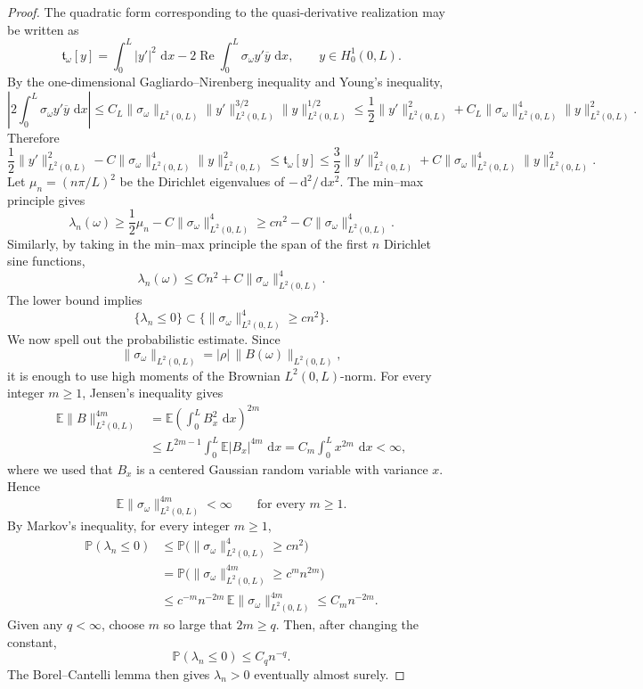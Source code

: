 \documentclass[11pt]{article}
\newcommand{\dd}{\,\mathrm d}
\newcommand{\E}{\mathbb E}
\newcommand{\Prob}{\mathbb P}
\begin{document}
\begin{proof}
 The quadratic form corresponding to the quasi-derivative realization may be written as
\[
    \mathfrak t_\omega[y]
    =\int_0^L |y'|^2\,\dd x
      -2\operatorname{Re}\int_0^L \sigma_\omega y'\overline y\,\dd x,
    \qquad y\in H_0^1(0,L).
\]
By the one-dimensional Gagliardo--Nirenberg inequality and Young's inequality,
\[
    \left|2\int_0^L\sigma_\omega y'\overline y\,\dd x\right|
    \le C_L\|\sigma_\omega\|_{L^2(0,L)}\|y'\|_{L^2(0,L)}^{3/2}\|y\|_{L^2(0,L)}^{1/2}
    \le \frac12\|y'\|_{L^2(0,L)}^2
        +C_L\|\sigma_\omega\|_{L^2(0,L)}^4\|y\|_{L^2(0,L)}^2.
\]
Therefore
\[
    \frac12\|y'\|_{L^2(0,L)}^2
      -C\|\sigma_\omega\|_{L^2(0,L)}^4\|y\|_{L^2(0,L)}^2
    \le
    \mathfrak t_\omega[y]
    \le
    \frac32\|y'\|_{L^2(0,L)}^2
      +C\|\sigma_\omega\|_{L^2(0,L)}^4\|y\|_{L^2(0,L)}^2 .
\]
Let \(\mu_n=(n\pi/L)^2\) be the Dirichlet eigenvalues of \(-\dd^2/\dd x^2\). The min--max principle gives
\[
    \lambda_n(\omega)
    \ge \frac12 \mu_n-C\|\sigma_\omega\|_{L^2(0,L)}^4
    \ge c n^2-C\|\sigma_\omega\|_{L^2(0,L)}^4 .
\]
Similarly, by taking in the min--max principle the span of the first \(n\) Dirichlet sine functions,
\[
    \lambda_n(\omega)
    \le C n^2+C\|\sigma_\omega\|_{L^2(0,L)}^4 .
\]
The lower bound implies
\[
    \{\lambda_n\le0\}
    \subset
    \{\|\sigma_\omega\|_{L^2(0,L)}^4\ge c n^2\}.
\]
We now spell out the probabilistic estimate. Since
\[
    \|\sigma_\omega\|_{L^2(0,L)}=|\rho|\,\|B(\omega)\|_{L^2(0,L)},
\]
it is enough to use high moments of the Brownian \(L^2(0,L)\)-norm. For every integer \(m\ge1\), Jensen's inequality gives
\[
\begin{aligned}
    \E\|B\|_{L^2(0,L)}^{4m}
    &=\E\left(\int_0^L B_x^2\,\dd x\right)^{2m}  \\
    &\le L^{2m-1}\int_0^L \E |B_x|^{4m}\,\dd x
      = C_m\int_0^L x^{2m}\,\dd x <\infty,
\end{aligned}
\]
where we used that \(B_x\) is a centered Gaussian random variable with variance \(x\). Hence
\[
    \E\|\sigma_\omega\|_{L^2(0,L)}^{4m}<\infty
    \qquad\text{for every }m\ge1.
\]
By Markov's inequality, for every integer \(m\ge1\),
\[
\begin{aligned}
    \Prob(\lambda_n\le0)
    &\le \Prob\bigl(\|\sigma_\omega\|_{L^2(0,L)}^4\ge c n^2\bigr)  \\
    &=\Prob\bigl(\|\sigma_\omega\|_{L^2(0,L)}^{4m}\ge c^m n^{2m}\bigr)  \\
    &\le c^{-m}n^{-2m}\,
       \E\|\sigma_\omega\|_{L^2(0,L)}^{4m}
      \le C_m n^{-2m}.
\end{aligned}
\]
Given any \(q<\infty\), choose \(m\) so large that \(2m\ge q\). Then, after changing the constant,
\[
    \Prob(\lambda_n\le0)\le C_q n^{-q}.
\]
The Borel--Cantelli lemma then gives \(\lambda_n>0\) eventually almost surely.


\end{proof}
\end{document}
